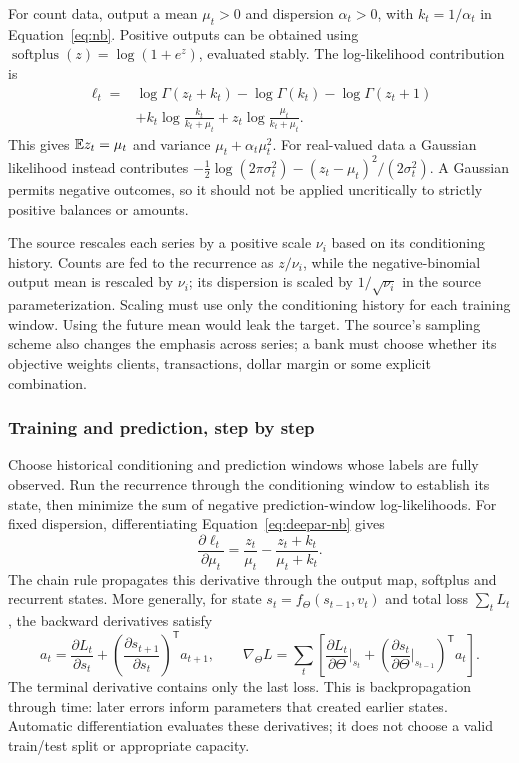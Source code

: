 For count data, output a mean $\mu_t>0$ and dispersion $\alpha_t>0$, with $k_t=1/\alpha_t$ in Equation~\eqref{eq:nb}. Positive outputs can be obtained using $\operatorname{softplus}(z)=\log(1+e^z)$, evaluated stably. The log-likelihood contribution is
\begin{align}
 \ell_t={}&\log\Gamma(z_t+k_t)-\log\Gamma(k_t)-\log\Gamma(z_t+1)\nonumber\\
 &+k_t\log\frac{k_t}{k_t+\mu_t}
  +z_t\log\frac{\mu_t}{k_t+\mu_t}.
 \label{eq:deepar-nb}
\end{align}
This gives $\mathbb{E} z_t=\mu_t$ and variance $\mu_t+\alpha_t\mu_t^2$. For real-valued data a Gaussian likelihood instead contributes $-\tfrac12\log(2\pi\sigma_t^2)-(z_t-\mu_t)^2/(2\sigma_t^2)$. A Gaussian permits negative outcomes, so it should not be applied uncritically to strictly positive balances or amounts.

The source rescales each series by a positive scale $\nu_i$ based on its conditioning history. Counts are fed to the recurrence as $z/\nu_i$, while the negative-binomial output mean is rescaled by $\nu_i$; its dispersion is scaled by $1/\sqrt{\nu_i}$ in the source parameterization. Scaling must use only the conditioning history for each training window. Using the future mean would leak the target. The source's sampling scheme also changes the emphasis across series; a bank must choose whether its objective weights clients, transactions, dollar margin or some explicit combination.

\subsubsection{Training and prediction, step by step}

Choose historical conditioning and prediction windows whose labels are fully observed. Run the recurrence through the conditioning window to establish its state, then minimize the sum of negative prediction-window log-likelihoods. For fixed dispersion, differentiating Equation~\eqref{eq:deepar-nb} gives
\[
 \frac{\partial\ell_t}{\partial\mu_t}
 =\frac{z_t}{\mu_t}-\frac{z_t+k_t}{\mu_t+k_t}.
\]
The chain rule propagates this derivative through the output map, softplus and recurrent states. More generally, for state $s_t=f_\Theta(s_{t-1},v_t)$ and total loss $\sum_t L_t$, the backward derivatives satisfy
\[
 a_t=\frac{\partial L_t}{\partial s_t}
      +\left(\frac{\partial s_{t+1}}{\partial s_t}\right)^{\mathsf T}a_{t+1},\qquad
 \nabla_\Theta L=\sum_t\left[
 \frac{\partial L_t}{\partial\Theta}\bigg|_{s_t}
 +\left(\frac{\partial s_t}{\partial\Theta}\bigg|_{s_{t-1}}\right)^{\mathsf T}a_t\right].
\]
The terminal derivative contains only the last loss. This is backpropagation through time: later errors inform parameters that created earlier states. Automatic differentiation evaluates these derivatives; it does not choose a valid train/test split or appropriate capacity.

